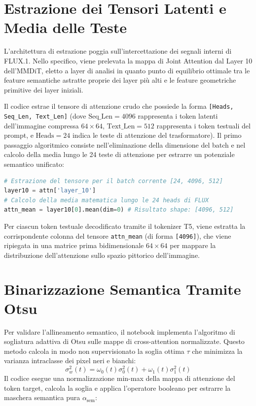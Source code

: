 \documentclass[12pt,a4paper]{report}
\begin{document}
\section{Estrazione dei Tensori Latenti e Media delle Teste}
L'architettura di estrazione poggia sull'intercettazione dei segnali interni di FLUX.1. Nello specifico, viene prelevata la mappa di Joint Attention dal Layer 10 dell'MMDiT, eletto a layer di analisi in quanto punto di equilibrio ottimale tra le feature semantiche astratte proprie dei layer più alti e le feature geometriche primitive dei layer iniziali.

Il codice estrae il tensore di attenzione crudo che possiede la forma \texttt{[Heads, Seq\_Len, Text\_Len]} (dove $\text{Seq\_Len} = 4096$ rappresenta i token latenti dell'immagine compressa $64\times 64$, $\text{Text\_Len} = 512$ rappresenta i token testuali del prompt, e $\text{Heads} = 24$ indica le teste di attenzione del trasformatore). Il primo passaggio algoritmico consiste nell'eliminazione della dimensione del batch e nel calcolo della media lungo le 24 teste di attenzione per estrarre un potenziale semantico unificato:

\begin{lstlisting}[language=Python, caption={Codice di estrazione dell'attenzione media per token}]
# Estrazione del tensore per il batch corrente [24, 4096, 512]
layer10 = attn['layer_10']
# Calcolo della media matematica lungo le 24 heads di FLUX
attn_mean = layer10[0].mean(dim=0) # Risultato shape: [4096, 512]
\end{lstlisting}

Per ciascun token testuale decodificato tramite il tokenizer T5, viene estratta la corrispondente colonna del tensore \texttt{attn\_mean} (di forma \texttt{[4096]}), che viene ripiegata in una matrice prima bidimensionale $64 \times 64$ per mappare la distribuzione dell'attenzione sullo spazio pittorico dell'immagine.

\section{Binarizzazione Semantica Tramite Otsu}
Per validare l'allineamento semantico, il notebook implementa l'algoritmo di sogliatura adattiva di Otsu \cite{otsu1979threshold} sulle mappe di cross-attention normalizzate. Questo metodo calcola in modo non supervisionato la soglia ottima $\tau$ che minimizza la varianza intraclasse dei pixel neri e bianchi:
\begin{equation}
    \sigma^2_w(t) = \omega_0(t)\sigma^2_0(t) + \omega_1(t)\sigma^2_1(t)
\end{equation}
Il codice esegue una normalizzazione min-max della mappa di attenzione del token target, calcola la soglia e applica l'operatore booleano per estrarre la maschera semantica pura $\alpha_{\text{sem}}$:
\end{document}
